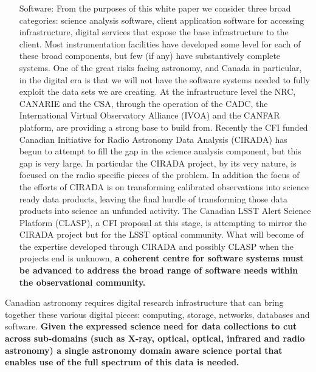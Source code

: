 \documentclass[11pt]{article}
\begin{document}
\begin{itemize}
    \item[Software:] From the purposes of this white paper we consider three broad categories: science analysis software, client application software for accessing infrastructure, digital services that expose the base infrastructure to the client.  Most instrumentation facilities have developed some level for each of these broad components, but few (if any) have substantively complete systems.  One of the great risks facing astronomy, and Canada in particular, in the digital era is that we  will not have the software systems needed to fully exploit the data sets we are creating.  At the infrastructure level the NRC, CANARIE and the CSA, through the operation of the CADC, the International Virtual Observatory Alliance (IVOA) and the CANFAR platform, are providing a strong base to build from.  Recently the CFI funded Canadian Initiative for Radio Astronomy Data Analysis (CIRADA) has begun to attempt to fill the gap in the science analysis component, but this gap is very large.  In particular the CIRADA project, by its very nature, is focused on the radio specific pieces of the problem.  In addition the focus of the efforts of CIRADA is on transforming calibrated observations into science ready data products, leaving the final hurdle of transforming those data products into science an unfunded activity.  The Canadian LSST Alert Science Platform (CLASP), a CFI proposal at this stage, is attempting to mirror the CIRADA project but for the LSST optical community.  What will become of the expertise developed through CIRADA and possibly CLASP when the projects end is unknown, {\bf a coherent centre for software systems must be advanced to address the broad range of software needs within the observational community.}
\end{itemize}

Canadian astronomy requires digital research infrastructure that can bring together these various digital pieces:  computing, storage,  networks, databases and software.  {\bf Given the expressed science need for data collections to cut across sub-domains (such as X-ray, optical, optical, infrared and radio astronomy) a single astronomy domain aware science portal that enables use of the full spectrum of this data is needed.}
\end{document}
